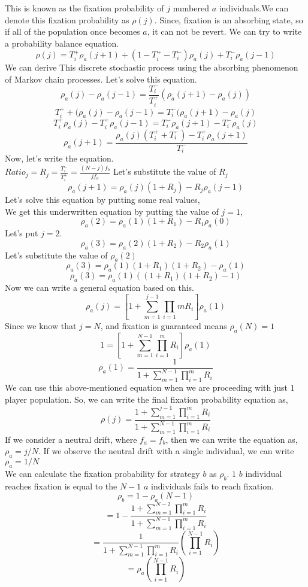 \documentclass{article}
\begin{document}
This is known as the fixation probability of $j$ numbered $a$ individuals.We can denote this fixation probability as $\rho(j)$.
Since, fixation is an absorbing state, so if all of the population once becomes $a$, it can not be revert. We can try to write a probability balance equation.
\[\rho(j)=T_i^+\rho_a(j+1)+(1-T_i^+-T_i^-)\rho_a(j)+T_i^-\rho_a(j-1)\]
We can derive This discrete stochastic process using the absorbing phenomenon of Markov chain processes.
Let's solve this equation.
\[\rho_a(j)-\rho_a(j-1)=\frac{T_i^-}{T_i^+}(\rho_a(j+1)-\rho_a(j))\]
\[T_i^++(\rho_a(j)-\rho_a(j-1)=T_i^-(\rho_a(j+1)-\rho_a(j)\]
\[T_i^+\rho_a(j)-T_i^+\rho_a(j-1)=T_i^-\rho_a(j+1)-T_i^-\rho_a(j)\]
\[\rho_a(j+1)=\frac{\rho_a(j)(T_i^+ + T_i^-)-T_i^+\rho_a(j+1)}{T_i^-}\]
 Now, let's write the equation.\\
 $Ratio_j=R_j=\frac{T_i^-}{T_i^+}= \frac{(N-j)f_b}{jf_a}$
 Let's substitute the value of $R_j$
 \[\rho_a(j+1)={\rho_a(j)(1+R_j)-R_j\rho_a(j-1)}\]
 Let's solve this equation by putting some real values,\\
 We get this underwritten equation by putting the value of $j=1$,
 \[\rho_a(2)= \rho_a(1)(1+R_1)-R_1\rho_a(0)\]
 Let's put $j=2$.
 \[\rho_a(3)=\rho_a(2)(1+R_2)-R_2\rho_a(1)\]
 Let's substitute the value of $\rho_a(2)$
 \[\rho_a(3)=\rho_a(1)(1+R_1)(1+R_2)-\rho_a(1)\]
 \[\rho_a(3)=\rho_a(1)((1+R_1)(1+R_2)-1)\]
 Now we can write a general equation based on this.
 \[\rho_a(j)=\left[1+\sum_{m=1}^{j-1}\prod_{i=1}{m}R_i \right] \rho_a(1)\]
 Since we know that $j=N$, and fixation is guaranteed means $\rho_a(N)=1$
 \[1=\left[1+\sum_{m=1}^{N-1}\prod_{i=1}^{m} R_i\right]\rho_a(1)\]
 \[\rho_a(1)=\frac{1}{1+\sum_{m=1}^{N-1}\prod_{i=1}^{m}R_i}\]
 We can use this above-mentioned equation when we are proceeding with just $1$ player population.
 So, we can write the final fixation probability equation as,
 \[\rho(j)=\frac{1+\sum_{m=1}^{j-1}\prod_{i=1}^{m}R_i}{1+\sum_{m=1}^{N-1}\prod_{i=1}^{m}R_i}\]
 If we consider a neutral drift, where $f_a=f_b$, then we can write the equation as, $\rho_a={j}/{N}$.
 If we observe the neutral drift with a single individual, we can write $\rho_a=1/N$\cite{Traulsen2006}\\

 We can calculate the fixation probability for strategy $b$ as $\rho_b$. $1$ $b$ individual reaches fixation is equal to the $N-1$ $a$ individuals fails to reach fixation.
\[\rho_b=1-\rho_a(N-1)\]
\[=1-\frac{1 + \sum_{m=1}^{N-2} \prod_{i=1}^{m} R_i}{1 + \sum_{m=1}^{N-1} \prod_{i=1}^{m} R_i}\]
\[=\frac{1}{1+\sum_{m=1}^{N-1}\prod_{i=1}^{m}R_i}(\prod_{i=1}^{N-1}R_i)\]
\[=\rho_a(\prod_{i=1}^{N-1}R_i)\]
\end{document}
